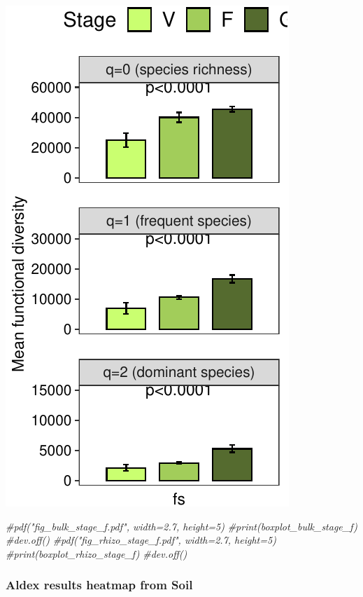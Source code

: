\documentclass[]{interact}
\theoremstyle{plain}%
\theoremstyle{definition}
\theoremstyle{remark}
\newenvironment{Shaded}{\begin{snugshade}}{\end{snugshade}}
\newcommand{\CommentTok}[1]{\textcolor[rgb]{0.56,0.35,0.01}{\textit{#1}}}
\begin{document}
\begin{center}\includegraphics{Doc_pdf_files/figure-latex/unnamed-chunk-33-2} \end{center}

\begin{Shaded}
\begin{Highlighting}[]
\CommentTok{\#pdf("fig\_bulk\_stage\_f.pdf", width=2.7, height=5)}
\CommentTok{\#print(boxplot\_bulk\_stage\_f)}
\CommentTok{\#dev.off()}
\CommentTok{\#pdf("fig\_rhizo\_stage\_f.pdf", width=2.7, height=5)}
\CommentTok{\#print(boxplot\_rhizo\_stage\_f)}
\CommentTok{\#dev.off()}
\end{Highlighting}
\end{Shaded}

\hypertarget{aldex-results-heatmap-from-soil-2}{%
\subsubsection{Aldex results heatmap from
Soil}\label{aldex-results-heatmap-from-soil-2}}
\end{document}
